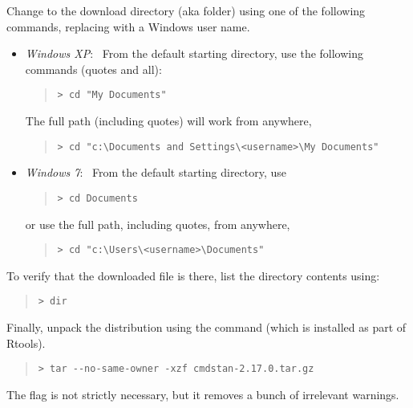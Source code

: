 Change to the download directory (aka folder) using one of the
following commands, replacing  with
a Windows user name.
%
\begin{itemize}
\item \emph{Windows XP}: \ From the default starting directory, use
the following commands (quotes and all):
\begin{quote}
\begin{Verbatim}[fontshape=sl,fontsize=\small]
> cd "My Documents"
\end{Verbatim}
\end{quote}
%
The full path (including quotes) will work from anywhere,
\begin{quote}
\begin{Verbatim}[fontshape=sl,fontsize=\small]
> cd "c:\Documents and Settings\<username>\My Documents"
\end{Verbatim}
\end{quote}
\item \emph{Windows 7}:  \  From the default starting directory, use
\begin{quote}
\begin{Verbatim}[fontshape=sl,fontsize=\small]
> cd Documents
\end{Verbatim}
\end{quote} 
or use the full path, including quotes, from anywhere,
\begin{quote}
\begin{Verbatim}[fontshape=sl,fontsize=\small]
> cd "c:\Users\<username>\Documents"
\end{Verbatim}
\end{quote}
\end{itemize}
%
To verify that the downloaded \CmdStan {} file is there,
list the directory contents using:
%
\begin{quote}
\begin{Verbatim}[fontshape=sl,fontsize=\small]
> dir
\end{Verbatim}
\end{quote}

Finally, unpack the distribution using the  command (which
is installed as part of Rtools).
%
\begin{quote}
\begin{Verbatim}[fontshape=sl,fontsize=\small]
> tar --no-same-owner -xzf cmdstan-2.17.0.tar.gz 
\end{Verbatim}
\end{quote}
%
The  flag is not strictly necessary,
but it removes a bunch of irrelevant warnings.


